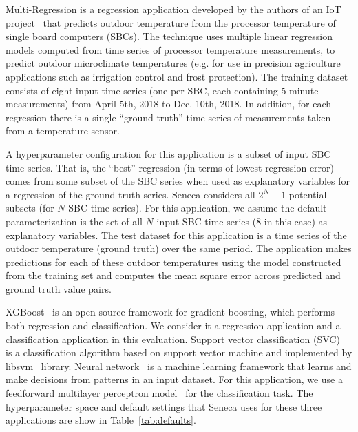 Multi-Regression is a regression application developed by the authors of an
IoT project~\cite{iot-cpu} that predicts outdoor temperature from the
processor temperature of single board computers (SBCs).  The technique uses
multiple linear regression models computed from time series of processor
temperature measurements, to predict outdoor microclimate temperatures (e.g.
for use in precision agriculture applications such as irrigation control and
frost protection).  The training dataset consists of eight input time series
(one per SBC, each containing 5-minute measurements) from April 5th, 2018 to
Dec. 10th, 2018.  In addition, for each regression there is a single ``ground
truth'' time series of measurements taken from a temperature sensor.

A hyperparameter configuration for this application is a subset of input SBC
time series.  That is, the ``best'' regression (in terms of lowest regression
error) comes from some subset of  the SBC series when used as explanatory
variables for a regression of the ground truth series.  Seneca considers all
\texttt{$2^N - 1$} potential subsets (for $N$ SBC time series).  For this
application, we assume the default parameterization is the set of all $N$
input SBC time series (8 in this case) as explanatory variables.  The test
dataset for this application is a time series of the outdoor temperature
(ground truth) over the same period.  The application makes predictions for
each of these outdoor temperatures using the model constructed from the
training set and computes the mean square error across predicted and ground
truth value pairs.

XGBoost~\cite{ref:xgboost-web} is an open source framework for gradient
boosting, which performs both regression and classification. We consider it a
regression application and a classification application in this evaluation.
Support vector classification (SVC)~\cite{ref:svc} is a classification
algorithm based on support vector machine and implemented by
libsvm~\cite{ref:libsvm} library.  Neural network~\cite{ref:neural_network} is
a machine learning framework that learns and make decisions from patterns in
an input dataset. For this application, we use a feedforward multilayer
perceptron model~\cite{ref:feedforward_nn} for the classification task. The
hyperparameter space and default settings that Seneca uses for these three
applications are show in Table~\ref{tab:defaults}.

